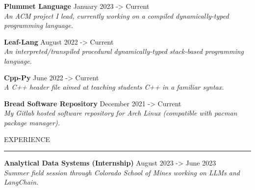 \documentclass[10pt,letterpaper]{article}
\newcommand{\customtext}[2]{%
    {\fontsize{#1}{\dimexpr #1pt+2pt}\selectfont #2}%
}
\begin{document}
\begin{flushleft}
    {\customtext{12}{\textbf{Plummet Language}} \hfill \customtext{12}{January 2023 -> Current}} \\
    \customtext{10}{\textit{An ACM project I lead, currently working on a compiled dynamically-typed programming language.}}
    \vspace{14pt}

    {\customtext{12}{\textbf{Leaf-Lang}} \hfill \customtext{12}{August 2022 -> Current}} \\
    \customtext{10}{\textit{An interpreted/transpiled procedural dynamically-typed stack-based programming language.}}
    \vspace{14pt}


    {\customtext{12}{\textbf{Cpp-Py}} \hfill \customtext{12}{June 2022 -> Current}} \\
    \customtext{10}{\textit{A C++ header file aimed at teaching students C++ in a familiar syntax.}}
    \vspace{14pt}


    {\customtext{12}{\textbf{Bread Software Repository}} \hfill \customtext{12}{December 2021 -> Current}} \\
    \customtext{10}{\textit{My Gitlab hosted software repository for Arch Linux (compatible with pacman package manager).}}
    \vspace{14pt}


    \textcolor{headercolor}{\customtext{14}{EXPERIENCE}}
    \textcolor{gray}{\rule{\textwidth}{2pt}}

    {\customtext{12}{\textbf{Analytical Data Systems (Internship)}} \hfill \customtext{12}{August 2023 -> June 2023}} \\
    \customtext{10}{\textit{Summer field session through Colorado School of Mines working on LLMs and LangChain.}}
    \vspace{14pt}


\end{flushleft}
\end{document}
